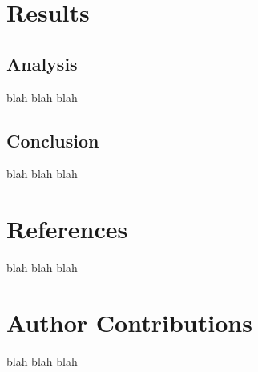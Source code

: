\documentclass[11pt]{article}
\begin{document}
\section{Results}
\label{sec:results}

\subsection{Analysis}
\label{subsec:analysis}
blah blah blah

\subsection{Conclusion}
\label{subsec:conclusion}
blah blah blah

\section{References}
\label{sec:references}
blah blah blah

\section{Author Contributions}
\label{sec:authorContributions}
blah blah blah

\appendix
\end{document}
